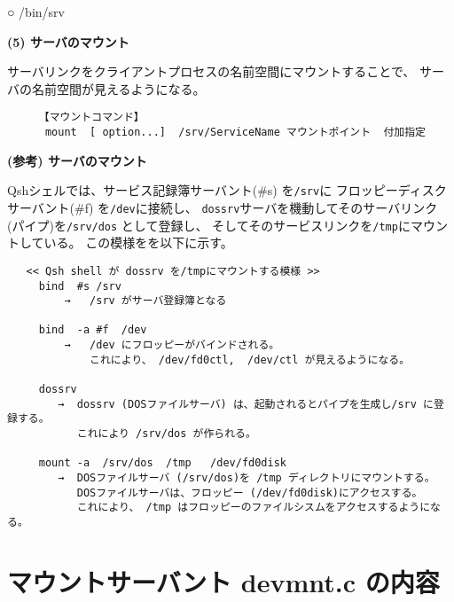 ○  /bin/srv



\vspace{6cm}



{\bf\flushleft (5) サーバのマウント}


サーバリンクをクライアントプロセスの名前空間にマウントすることで、
サーバの名前空間が見えるようになる。

\begin{verbatim}
     【マウントコマンド】
      mount  [ option...]  /srv/ServiceName マウントポイント  付加指定

\end{verbatim}







\vspace{4cm}



{\bf\flushleft (参考) サーバのマウント}

  Qshシェルでは、サービス記録簿サーバント(\#s) を{\tt /srv}に
フロッピーディスクサーバント(\#f) を{\tt /dev}に接続し、
{\tt dossrv}サーバを機動してそのサーバリンク(パイプ)を{\tt /srv/dos} として登録し、
そしてそのサービスリンクを{\tt /tmp}にマウントしている。
この模様をを以下に示す。

{\small
\begin{verbatim}
   << Qsh shell が dossrv を/tmpにマウントする模様 >>
     bind  #s /srv     
         →   /srv がサーバ登録簿となる

     bind  -a #f  /dev   
         →   /dev にフロッピーがバインドされる。
             これにより、 /dev/fd0ctl,  /dev/ctl が見えるようになる。

     dossrv    
        →  dossrv (DOSファイルサーバ) は、起動されるとパイプを生成し/srv に登録する。
           これにより /srv/dos が作られる。

     mount -a  /srv/dos  /tmp   /dev/fd0disk
        →  DOSファイルサーバ (/srv/dos)を /tmp ディレクトリにマウントする。
           DOSファイルサーバは、フロッピー (/dev/fd0disk)にアクセスする。
           これにより、 /tmp はフロッピーのファイルシスムをアクセスするようになる。
\end{verbatim}
}


\section{マウントサーバント devmnt.c の内容}

